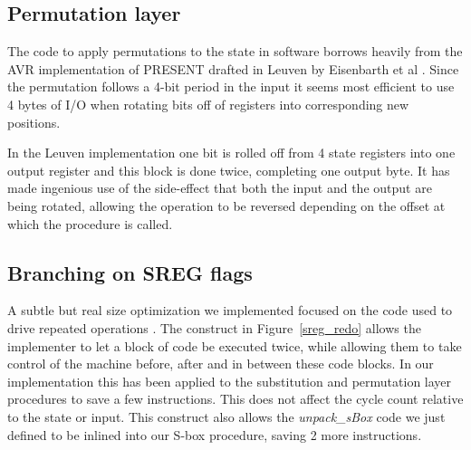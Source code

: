 \documentclass{llncs}
\begin{document}


\subsection{Permutation layer}
The code to apply permutations to the state in software borrows heavily from the AVR implementation of PRESENT drafted in Leuven by Eisenbarth et al \cite{eisenbarth2012compact}.
Since the permutation follows a 4-bit period in the input it seems most efficient to use 4 bytes of I/O when rotating bits off of registers into corresponding new positions.

In the Leuven implementation one bit is rolled off from 4 state registers into one output register and this block is done twice, completing one output byte. It has made ingenious use of the side-effect that both the input and the output are being rotated, allowing the operation to be reversed depending on the offset at which the procedure is called.

\subsection{Branching on SREG flags}
A subtle but real size optimization we implemented focused on the code used to drive repeated operations .
The construct in Figure~\ref{sreg_redo} allows the implementer to let a block of code be executed twice, while allowing them to take control of the machine before, after and in between these code blocks.
In our implementation this has been applied to the substitution and permutation layer procedures to save a few instructions.
This does not affect the cycle count relative to the state or input.
This construct also allows the \textit{unpack\_sBox} code we just defined to be inlined into our S-box procedure, saving 2 more instructions.
\end{document}

